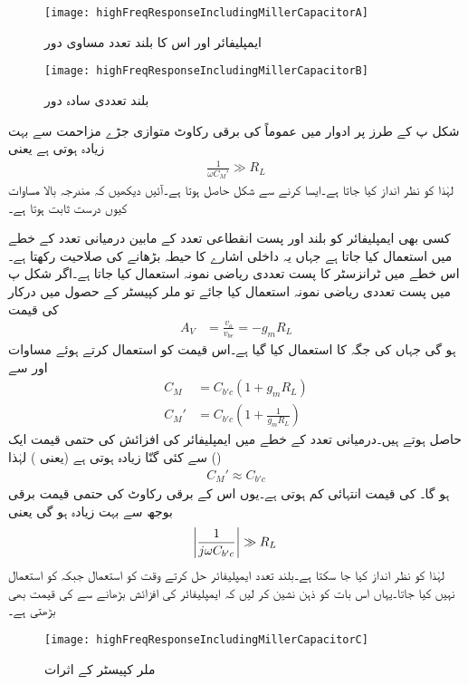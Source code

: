 \begin{figure}
\centering
\texttt{[image: highFreqResponseIncludingMillerCapacitorA]}
\caption{ایمپلیفائر اور اس کا بلند تعدد مساوی دور}
\label{شکل_تعددی_ردعمل_ایمپلیفائر_بلند_تعدد_مساوی_دور}
\end{figure}
%
\begin{figure}
\centering
\texttt{[image: highFreqResponseIncludingMillerCapacitorB]}
\caption{بلند تعددی سادہ دور}
\label{شکل_تعددی_ردعمل_بلند_تعددی_سادہ_دور}
\end{figure}
شکل  پ کے طرز پر ادوار میں عموماً  کی برقی رکاوٹ متوازی جڑے مزاحمت  سے بہت زیادہ ہوتی ہے یعنی
\begin{align}
\frac{1}{\omega C_M'} \gg R_L
\end{align}
لہٰذا   کو نظر انداز کیا جاتا ہے۔ایسا کرنے سے شکل  حاصل ہوتا ہے۔آئیں دیکھیں کہ مندرجہ بالا مساوات کیوں درست ثابت ہوتا ہے۔

کسی بھی ایمپلیفائر کو بلند اور پست انقطاعی تعدد کے مابین درمیانی تعدد کے خطے میں استعمال کیا جاتا ہے جہاں یہ داخلی اشارے کا حیطہ بڑھانے کی صلاحیت رکھتا ہے۔اس خطے میں ٹرانزسٹر کا پست تعددی ریاضی نمونہ استعمال کیا جاتا ہے۔اگر شکل  پ میں پست تعددی ریاضی نمونہ استعمال کیا جائے تو ملر کپیسٹر کے حصول میں درکار  کی قیمت
\begin{align}
A_V&=\frac{v_o}{v_{be}}=-g_m R_L
\end{align}
ہو گی جہاں  کی جگہ  کا استعمال کیا گیا ہے۔اس قیمت کو استعمال کرتے ہوئے مساوات  اور  سے
\begin{align} \label{مساوات_تعددی_ردعمل_ملر_کپیسٹر_قیمت}
C_M&=C_{b'c}\left(1+g_m R_L \right)\\
C_M'&=C_{b'c} \left(1+\frac{1}{g_m R_L} \right) 
\end{align}
حاصل ہوتے ہیں۔درمیانی تعدد کے خطے میں ایمپلیفائر کی افزائش کی حتمی قیمت   ایک () سے کئی گنّا زیادہ ہوتی ہے (یعنی   ) لہٰذا
\begin{align}
C_M' \approx C_{b'c}
\end{align}
ہو گا۔ کی قیمت انتہائی کم ہوتی ہے۔یوں اس کے برقی رکاوٹ کی حتمی قیمت برقی بوجھ سے بہت زیادہ ہو گی یعنی 
\begin{align}
\abs{\frac{1}{j \omega C_{b'c}}} \gg R_L
\end{align}
لہٰذا  کو نظر انداز کیا جا سکتا ہے۔بلند تعدد ایمپلیفائر  حل کرتے وقت  کو استعمال جبکہ  کو استعمال نہیں کیا جاتا۔یہاں اس بات کو ذہن نشین کر لیں کہ ایمپلیفائر کی افزائش بڑھانے سے  کی قیمت بھی بڑھتی ہے۔
\begin{figure}
\centering
\texttt{[image: highFreqResponseIncludingMillerCapacitorC]}
\caption{ملر کپیسٹر کے اثرات}
\label{شکل_تعددی_ردعمل_بلند_تعددی_سادہ_دور_الف}
\end{figure}

